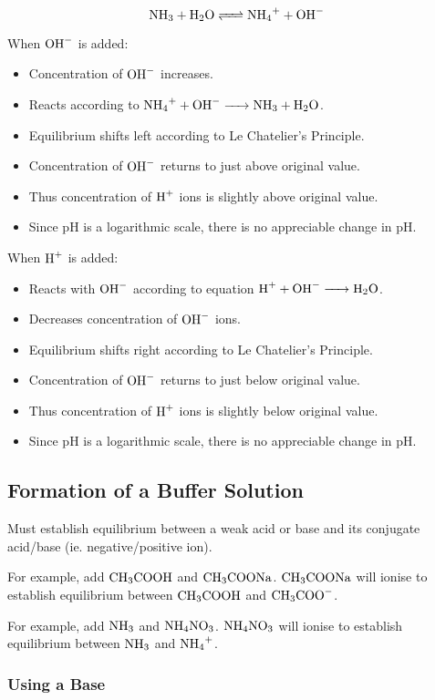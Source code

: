 \documentclass[a4paper,11pt]{article}
\begin{document}
$$
\ce{NH3 + H2O <=> NH4+ + OH-}
$$

When $\ce{OH-}$ is added:

\begin{itemize}
\item Concentration of $\ce{OH-}$ increases.
\item Reacts according to $\ce{NH4+ + OH- -> NH3 + H2O}$.
\item Equilibrium shifts left according to Le Chatelier's Principle.
\item Concentration of $\ce{OH-}$ returns to just above original value.
\item Thus concentration of $\ce{H+}$ ions is slightly above original value.
\item Since pH is a logarithmic scale, there is no appreciable change in pH.
\end{itemize}

When $\ce{H+}$ is added:

\begin{itemize}
\item Reacts with $\ce{OH-}$ according to equation $\ce{H+ + OH- -> H2O}$.
\item Decreases concentration of $\ce{OH-}$ ions.
\item Equilibrium shifts right according to Le Chatelier's Principle.
\item Concentration of $\ce{OH-}$ returns to just below original value.
\item Thus concentration of $\ce{H+}$ ions is slightly below original value.
\item Since pH is a logarithmic scale, there is no appreciable change in pH.
\end{itemize}


\subsection{Formation of a Buffer Solution}

Must establish equilibrium between a weak acid or base and its conjugate
acid/base (ie. negative/positive ion).

For example, add $\ce{CH3COOH}$ and $\ce{CH3COONa}$. $\ce{CH3COONa}$ will ionise
to establish equilibrium between $\ce{CH3COOH}$ and $\ce{CH3COO-}$.

For example, add $\ce{NH3}$ and $\ce{NH4NO3}$. $\ce{NH4NO3}$ will ionise to
establish equilibrium between $\ce{NH3}$ and $\ce{NH4+}$.


\subsubsection{Using a Base}
\end{document}
